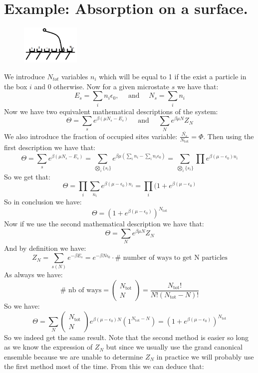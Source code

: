 \documentclass[10pt,a4paper]{book}
\begin{document}
\section{Example: Absorption on a surface.}
\begin{figure}
    \includegraphics[width=0.25\textwidth]{graphs/absorbsurface}
\end{figure}
We introduce $N_{tot}$ variables $n_i$ which will be equal to 1 if the exist a particle in the box $i$ and 0 otherwise. Now for a given microstate $s$ we have that:
\[
E_s = \sum_i n_i \epsilon_0, \quad \text{ and } \quad N_s = \sum_i n_i
\]
Now we have two equivalent mathematical descriptions of the system:
\[
\Theta = \sum_{s} e^{\beta(\mu N_s - E_s)} \quad \text{ and } \quad \sum_N e^{\beta \mu N} Z_N
\]
We also introduce the fraction of occupied sites variable: $\frac{\bar{N_s}}{N_\text{tot}} = \Phi$. Then using the first description we have that:
\[
\Theta = \sum_s e^{\beta(\mu N_s - E_s)} = \sum_{\bigotimes_{i} \{s_i\} } e^{\beta \mu (\sum_i n_i - \sum_i n_i \epsilon_0)} = \sum_{\bigotimes_i \{s_i\}} \prod e^{\beta(\mu - \epsilon_0)n_i}
\]
So we get that:
\[
\Theta = \prod_i \sum_{n_i} e^{\beta(\mu - \epsilon_0)n_i} = \prod_i (1 + e^{\beta(\mu - \epsilon_0)}
\]
So in conclusion we have:
\[
\Theta = (1 + e^{\beta(\mu - \epsilon_0)})^{N_\text{tot}}
\]
Now if we use the second mathematical description we have that:
\[
\Theta = \sum_N e^{\beta \mu N} Z_N
\]
And by definition we have:
\[
Z_N = \sum_{s(N)} e^{-\beta E_s} = e^{-\beta N \epsilon_0} \cdot \# \text{ number of ways to get N particles}
\]
As always we have:
\[
\# \text{ nb of ways} = \begin{pmatrix}
N_\text{tot}\\N
\end{pmatrix}
= \frac{N_\text{tot}!}{N! (N_\text{tot} - N)!}
\]
So we have:
\[
\Theta = \sum_{N} \begin{pmatrix}
N_\text{tot}\\ N
\end{pmatrix}
e^{\beta(\mu - \epsilon_0)N} (1^{N_\text{tot} - N}) = \left(1 + e^{\beta(\mu - \epsilon_0)}\right)^{N_\text{tot}}
\]
So we indeed get the same result. Note that the second method is easier so long as we know the expression of $Z_N$ but since we usually use the grand canonical ensemble because we are unable to determine $Z_N$ in practice we will probably use the first method most of the time. From this we can deduce that:
\end{document}
